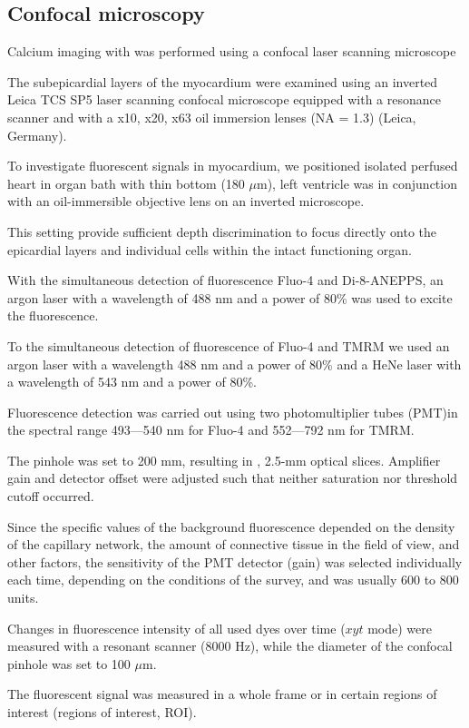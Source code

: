 \documentclass{biophys-new}
\begin{document}
\subsection*{Confocal microscopy}

Calcium imaging with  was performed using a confocal laser scanning microscope

The subepicardial layers of the myocardium were examined using an inverted Leica TCS SP5 laser scanning confocal microscope equipped with a resonance scanner and with a x10, x20, x63 oil immersion lenses (NA = 1.3) (Leica, Germany).

To investigate fluorescent signals in myocardium, we positioned isolated perfused heart in organ bath with thin bottom (180 $\mu$m), left ventricle was in conjunction with an oil-immersible objective lens on an inverted microscope.

This setting provide sufficient depth discrimination to focus directly onto the epicardial layers and individual cells within the intact functioning organ.

With the simultaneous detection of fluorescence Fluo-4 and Di-8-ANEPPS, an argon laser with a wavelength of 488 nm and a power of 80\% was used to excite the fluorescence.

To the simultaneous detection of fluorescence of Fluo-4 and TMRM we used an argon laser with a wavelength 488 nm and a power of 80\% and a HeNe laser with a wavelength of 543 nm and a power of 80\%.

Fluorescence detection was carried out using two photomultiplier tubes (PMT)in the spectral range 493---540 nm for Fluo-4 and 552---792 nm for TMRM.

The pinhole was set to 200 mm, resulting in , 2.5-mm optical slices. Amplifier gain and detector offset were adjusted such that neither saturation nor threshold cutoff occurred.

Since the specific values of the background fluorescence depended on the density of the capillary network, the amount of connective tissue in the field of view, and other factors, the sensitivity of the PMT detector (gain) was selected individually each time, depending on the conditions of the survey, and was usually 600 to 800 units.

Changes in fluorescence intensity of all used dyes over time ($xyt$ mode) were measured with a resonant scanner (8000 Hz), while the diameter of the confocal pinhole was set to 100 $\mu$m.

The fluorescent signal was measured in a whole frame or in certain regions of interest (regions of interest, ROI).
\end{document}
